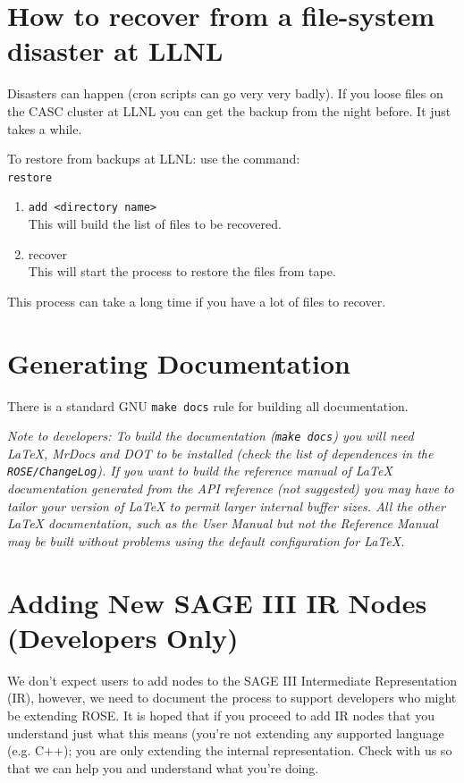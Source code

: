 \section{How to recover from a file-system disaster at LLNL}%
   Disasters can happen (cron scripts can go very very badly).  If you 
loose files on the CASC cluster at LLNL you can get the backup from the 
night before.  It just takes a while.

   To restore from backups at LLNL: use the command: \\
{\tt restore}
\begin{enumerate}
   \item {\tt add <directory name>} \\
       This will build the list of files to be recovered.
   \item recover \\
       This will start the process to restore the files from tape.
\end{enumerate}
   This process can take a long time if you have a lot of files to recover.

\section{Generating Documentation}%
   There is a standard GNU {\tt make docs} rule for building all documentation.

{\it Note to developers: To build the documentation ({\tt make docs}) you will need 
LaTeX, MrDocs and DOT to be installed (check the list of dependences in the 
{\tt ROSE/ChangeLog}). If you want to build the reference manual of LaTeX documentation
generated from the API reference (not suggested) you may have to tailor your version of LaTeX to 
permit larger internal buffer sizes.  All the other LaTeX documentation, such as the
User Manual but not the Reference Manual may be built without problems using the 
default configuration for LaTeX.
}

\section {Adding New SAGE III IR Nodes (Developers Only)}%
    We don't expect users to add nodes to the SAGE III Intermediate Representation (IR),
however, we need to document the process to support developers who might be extending
ROSE.  It is hoped that if you proceed to add IR nodes that you understand just
what this means (you're not extending any supported language (e.g. C++); you are only
extending the internal representation. Check with us so that we can help you and
understand what you're doing.

